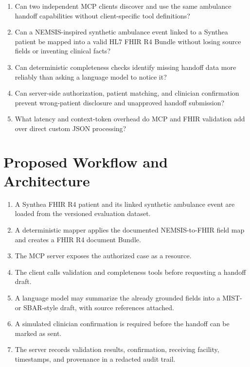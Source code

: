 \documentclass[10pt]{article}
\begin{document}
\begin{enumerate}
  \item Can two independent MCP clients discover and use the same ambulance handoff capabilities without client-specific tool definitions?
  \item Can a NEMSIS-inspired synthetic ambulance event linked to a Synthea patient be mapped into a valid HL7 FHIR R4 Bundle without losing source fields or inventing clinical facts?
  \item Can deterministic completeness checks identify missing handoff data more reliably than asking a language model to notice it?
  \item Can server-side authorization, patient matching, and clinician confirmation prevent wrong-patient disclosure and unapproved handoff submission?
  \item What latency and context-token overhead do MCP and FHIR validation add over direct custom JSON processing?
\end{enumerate}

\section{Proposed Workflow and Architecture}

\begin{enumerate}
  \item A Synthea FHIR R4 patient and its linked synthetic ambulance event are loaded from the versioned evaluation dataset.
  \item A deterministic mapper applies the documented NEMSIS-to-FHIR field map and creates a FHIR R4 document Bundle.
  \item The MCP server exposes the authorized case as a resource.
  \item The client calls validation and completeness tools before requesting a handoff draft.
  \item A language model may summarize the already grounded fields into a MIST- or SBAR-style draft, with source references attached.
  \item A simulated clinician confirmation is required before the handoff can be marked as sent.
  \item The server records validation results, confirmation, receiving facility, timestamps, and provenance in a redacted audit trail.
\end{enumerate}
\end{document}
